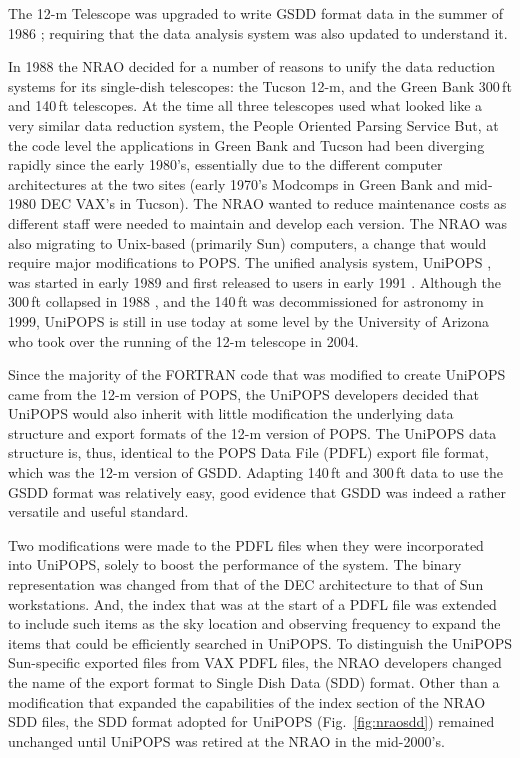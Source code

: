 \documentclass[final,authoryear,5p,times,twocolumn]{elsarticle}
\newcommand{\ascl}[1]{\href{http://www.ascl.net/#1}{ascl:#1}}
\begin{document}
The 12-m Telescope was upgraded to write GSDD format data in the
summer of 1986 \citep{tcus23,1987NRAO30}; requiring that the data
analysis system was also updated to understand it.

In 1988 the NRAO decided for a number of reasons to unify the data
reduction systems for its single-dish telescopes: the Tucson 12-m, and
the Green Bank 300\,ft and 140\,ft telescopes.  At the time all three
telescopes used what looked like a very similar data reduction system,
the People Oriented Parsing Service \citep[POPS;][]{1982POPS}
But, at the code level the applications in Green Bank
and Tucson had been diverging rapidly since the early 1980's,
essentially due to the different computer architectures at the two
sites (early 1970's Modcomps in Green Bank and mid-1980 DEC VAX's in
Tucson).  The NRAO wanted to reduce maintenance costs as different
staff were needed to maintain and develop each version.  The NRAO was
also migrating to Unix-based (primarily Sun) computers, a change that
would require major modifications to POPS. The unified analysis system, UniPOPS
\citep[][\ascl{1503.007}]{UNIPOPS}, was started in early 1989 and first released to users in early
1991 \citep{1991BAAS...23..535V}.  Although the 300\,ft collapsed in
1988 \citep{1990BAAS...22..487V}, and the 140\,ft was
decommissioned for astronomy in 1999, UniPOPS is still in use today at
some level by the University of Arizona who took over the running of
the 12-m telescope in 2004.

Since the majority of the FORTRAN code that was modified to create
UniPOPS came from the 12-m version of POPS, the UniPOPS developers
decided that UniPOPS would also inherit with little modification the
underlying data structure and export formats of the 12-m version of
POPS.  The UniPOPS data structure is, thus, identical to the POPS Data File
(PDFL) export file format, which was the 12-m version of GSDD.  Adapting 140\,ft
and 300\,ft data to use the GSDD format was
relatively easy, good evidence that GSDD was indeed a rather versatile
and useful standard.

Two modifications were made to the PDFL files when they were
incorporated into UniPOPS, solely to boost the performance of the
system.  The binary representation was changed from that of the DEC
architecture to that of Sun workstations.  And, the index that was at
the start of a PDFL file was extended to include such items as the sky
location and observing frequency to expand the items that could be 
efficiently searched in UniPOPS.  To distinguish the UniPOPS
Sun-specific exported files from VAX PDFL files, the NRAO developers
changed the name of the export format to Single Dish Data (SDD) format.
Other than a modification that expanded the capabilities of the index
section of the NRAO SDD files, the SDD format adopted for UniPOPS
(Fig.~\ref{fig:nraosdd}) remained unchanged until UniPOPS was retired
at the NRAO in the mid-2000's.
\end{document}
